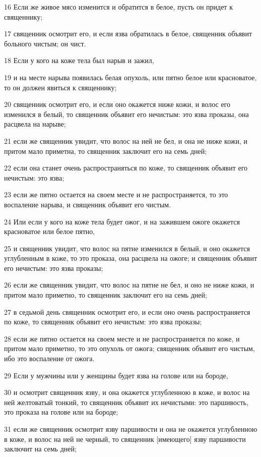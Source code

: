 \par 16 Если же живое мясо изменится и обратится в белое, пусть он придет к священнику;
\par 17 священник осмотрит его, и если язва обратилась в белое, священник объявит больного чистым; он чист.
\par 18 Если у кого на коже тела был нарыв и зажил,
\par 19 и на месте нарыва появилась белая опухоль, или пятно белое или красноватое, то он должен явиться к священнику;
\par 20 священник осмотрит его, и если оно окажется ниже кожи, и волос его изменился в белый, то священник объявит его нечистым: это язва проказы, она расцвела на нарыве;
\par 21 если же священник увидит, что волос на ней не бел, и она не ниже кожи, и притом мало приметна, то священник заключит его на семь дней;
\par 22 если она станет очень распространяться по коже, то священник объявит его нечистым: это язва;
\par 23 если же пятно остается на своем месте и не распространяется, то это воспаление нарыва, и священник объявит его чистым.
\par 24 Или если у кого на коже тела будет ожог, и на зажившем ожоге окажется красноватое или белое пятно,
\par 25 и священник увидит, что волос на пятне изменился в белый, и оно окажется углубленным в коже, то это проказа, она расцвела на ожоге; и священник объявит его нечистым: это язва проказы;
\par 26 если же священник увидит, что волос на пятне не бел, и оно не ниже кожи, и притом мало приметно, то священник заключит его на семь дней;
\par 27 в седьмой день священник осмотрит его, и если оно очень распространяется по коже, то священник объявит его нечистым: это язва проказы;
\par 28 если же пятно остается на своем месте и не распространяется по коже, и притом мало приметно, то это опухоль от ожога; священник объявит его чистым, ибо это воспаление от ожога.
\par 29 Если у мужчины или у женщины будет язва на голове или на бороде,
\par 30 и осмотрит священник язву, и она окажется углубленною в коже, и волос на ней желтоватый тонкий, то священник объявит их нечистыми: это паршивость, это проказа на голове или на бороде;
\par 31 если же священник осмотрит язву паршивости и она не окажется углубленною в коже, и волос на ней не черный, то священник [имеющего] язву паршивости заключит на семь дней;
